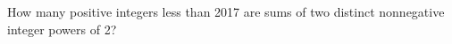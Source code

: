 How many positive integers less than 2017 are sums of two distinct nonnegative integer powers of 2?
